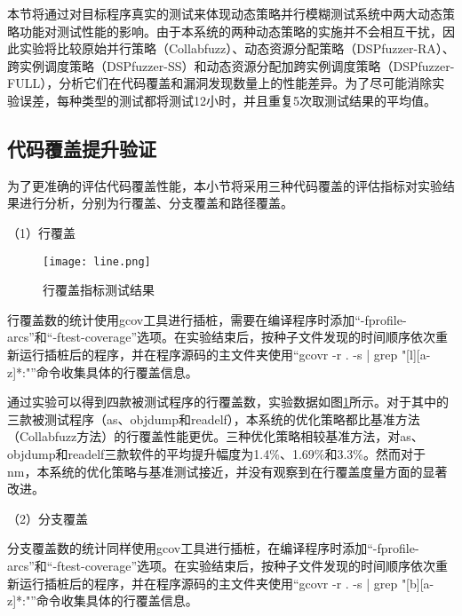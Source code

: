 \documentclass[master]{thesis-uestc}
\begin{document}
本节将通过对目标程序真实的测试来体现动态策略并行模糊测试系统中两大动态策略功能对测试性能的影响。由于本系统的两种动态策略的实施并不会相互干扰，因此实验将比较原始并行策略（Collabfuzz）、动态资源分配策略（DSPfuzzer-RA）、跨实例调度策略（DSPfuzzer-SS）和动态资源分配加跨实例调度策略（DSPfuzzer-FULL），分析它们在代码覆盖和漏洞发现数量上的性能差异。为了尽可能消除实验误差，每种类型的测试都将测试12小时，并且重复5次取测试结果的平均值。

\subsection{代码覆盖提升验证}

为了更准确的评估代码覆盖性能，本小节将采用三种代码覆盖的评估指标对实验结果进行分析，分别为行覆盖、分支覆盖和路径覆盖。



（1）行覆盖

\begin{figure}[!htbp]
    \vspace{6pt}
    \centering
    \texttt{[image: line.png]}
    \caption{行覆盖指标测试结果}
    \label{line}
\end{figure}
 
行覆盖数的统计使用gcov工具进行插桩，需要在编译程序时添加“-fprofile-arcs”和“-ftest-coverage”选项。在实验结束后，按种子文件发现的时间顺序依次重新运行插桩后的程序，并在程序源码的主文件夹使用“gcovr -r . -s | grep "[l][a-z]*:"”命令收集具体的行覆盖信息。

通过实验可以得到四款被测试程序的行覆盖数，实验数据如图\ref{line}所示。对于其中的三款被测试程序（as、objdump和readelf），本系统的优化策略都比基准方法（Collabfuzz方法）的行覆盖性能更优。三种优化策略相较基准方法，对as、objdump和readelf三款软件的平均提升幅度为1.4\%、1.69\%和3.3\%。然而对于nm，本系统的优化策略与基准测试接近，并没有观察到在行覆盖度量方面的显著改进。

（2）分支覆盖

分支覆盖数的统计同样使用gcov工具进行插桩，在编译程序时添加“-fprofile-arcs”和“-ftest-coverage”选项。在实验结束后，按种子文件发现的时间顺序依次重新运行插桩后的程序，并在程序源码的主文件夹使用“gcovr -r . -s | grep "[b][a-z]*:"”命令收集具体的行覆盖信息。
\end{document}
